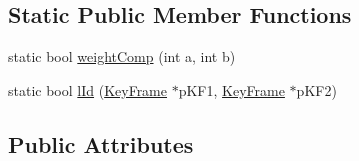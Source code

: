 \subsection*{Static Public Member Functions}
\begin{DoxyCompactItemize}
\item 
static bool \mbox{\hyperlink{class_o_r_b___s_l_a_m2_1_1_key_frame_ad2d0287d1ca4a91cd9d684754c84a08b}{weight\+Comp}} (int a, int b)
\item 
static bool \mbox{\hyperlink{class_o_r_b___s_l_a_m2_1_1_key_frame_a921334deb73b3103f5a78322eab9bc99}{l\+Id}} (\mbox{\hyperlink{class_o_r_b___s_l_a_m2_1_1_key_frame}{Key\+Frame}} $\ast$p\+K\+F1, \mbox{\hyperlink{class_o_r_b___s_l_a_m2_1_1_key_frame}{Key\+Frame}} $\ast$p\+K\+F2)
\end{DoxyCompactItemize}
\subsection*{Public Attributes}
